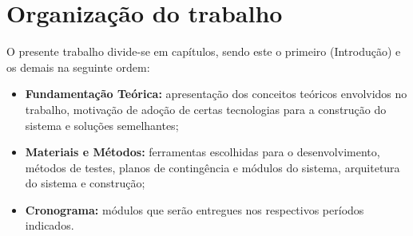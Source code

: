 \section{Organização do trabalho}
O presente trabalho divide-se em capítulos, sendo este o primeiro (Introdução) e os demais na seguinte ordem:

\begin{itemize}
  \item \textbf{Fundamentação Teórica:} apresentação dos conceitos teóricos envolvidos no trabalho, motivação de
  adoção de certas tecnologias para a construção do sistema e soluções semelhantes;
  \item \textbf{Materiais e Métodos:} ferramentas escolhidas para o desenvolvimento, métodos de testes, planos de contingência e módulos
  do sistema, arquitetura do sistema e construção;
  \item \textbf{Cronograma:} módulos que serão entregues nos respectivos períodos indicados.
\end{itemize}
